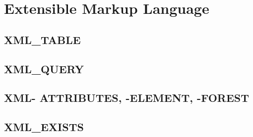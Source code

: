 \section[XML]{Extensible Markup Language}
\label{sec:xml}

\subsection{XML\_TABLE}
\label{sec:xml.xml_table}

\subsection{XML\_QUERY}
\label{sec:xml.xml_query}

\subsection{XML- ATTRIBUTES, -ELEMENT, -FOREST}
\label{sec:xml.xml_attr-ele-fore}

\subsection{XML\_EXISTS}
\label{sec:xml.xml_exists}
